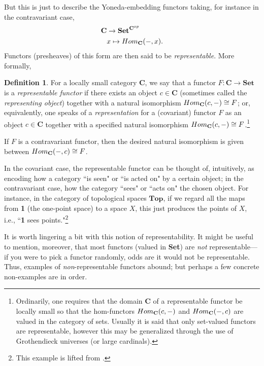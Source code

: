 \documentclass[a4paper]{book}
\theoremstyle{definition}
\theoremstyle{definition}
\newtheorem{definition}{Definition}[section]
\theoremstyle{definition}
\theoremstyle{theorem}
\theoremstyle{definition}
\begin{document}
But this is just to describe the Yoneda-embedding functors taking, for instance in the contravariant case, 
\begin{align*}
\textbf{C} & \rightarrow \textbf{Set}^{\textbf{C}^{op}} \\ 
& x \mapsto Hom_{\textbf{C}}(\--, x). 
\end{align*}
Functors (presheaves) of this form are then said to be \textit{representable}. More formally, 
\begin{definition} 
	For a locally small category $\textbf{C}$, we say that a functor $F:\textbf{C} \rightarrow \textbf{Set}$ is a \textit{representable functor}  if there exists an object $c \in \textbf{C}$ (sometimes called the \textit{representing object}) together with a natural isomorphism $Hom_{\textbf{C}}(c, \--) \cong F$; or, equivalently, one speaks of a \textit{representation} for a (covariant) functor $F$ as an object $c \in \textbf{C}$ together with a specified natural isomorphism $Hom_{\textbf{C}}(c, \--) \cong F$.\footnote{Ordinarily, one requires that the domain \textbf{C} of a representable functor be locally small so that the hom-functors $Hom_{\textbf{C}}(c, \--)$ and $Hom_{\textbf{C}}(\--, c)$ are valued in the category of sets. Usually it is said that only set-valued functors are representable, however this may be generalized through the use of Grothendieck universes (or large cardinals).} \par 
	If $F$ is a contravariant functor, then the desired natural isomorphism is given between $Hom_{\textbf{C}}(\--, c) \cong F$.
\end{definition}
 In the covariant case, the representable functor can be thought of, intuitively, as encoding how a category ``is seen" or ``is acted on" by a certain object; in the contravariant case, how the category ``sees" or ``acts on" the chosen object. For instance, in the category of topological spaces $\textbf{Top}$, if we regard all the maps from \textbf{1} (the one-point space) to a space $X$, this just produces the points of $X$, i.e., ``\textbf{1} sees points."\footnote{This example is lifted from \cite{leinster_basic_2014}.} \par 
It is worth lingering a bit with this notion of representability. It might be useful to mention, moreover, that most functors (valued in \textbf{Set}) are \textit{not} representable---if you were to pick a functor randomly, odds are it would not be representable. Thus, examples of \textit{non}-representable functors abound; but perhaps a few concrete non-examples are in order. 
\end{document}
